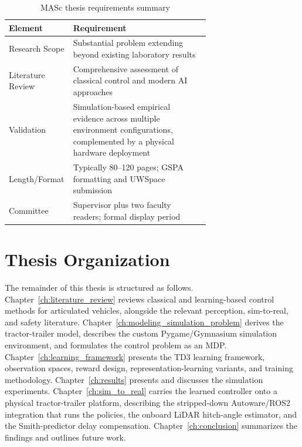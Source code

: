 \begin{table}[H]
\centering
\caption{MASc thesis requirements summary}
\label{tab:masc_requirements}
\begin{tabular}{l p{0.68\linewidth}}
\toprule
Element & Requirement \\
\midrule
Research Scope   & Substantial problem extending beyond existing laboratory results \\
Literature Review & Comprehensive assessment of classical control and modern AI approaches \\
Validation       & Simulation-based empirical evidence across multiple environment configurations, complemented by a physical hardware deployment \\
Length/Format    & Typically 80--120 pages; GSPA formatting and UWSpace submission \\
Committee        & Supervisor plus two faculty readers; formal display period \\
\bottomrule
\end{tabular}
\end{table}

\section{Thesis Organization}

The remainder of this thesis is structured as follows. Chapter~\ref{ch:literature_review} reviews classical and learning-based control methods for articulated vehicles, alongside the relevant perception, sim-to-real, and safety literature. Chapter~\ref{ch:modeling_simulation_problem} derives the tractor-trailer model, describes the custom Pygame/Gymnasium simulation environment, and formulates the control problem as an MDP. Chapter~\ref{ch:learning_framework} presents the TD3 learning framework, observation spaces, reward design, representation-learning variants, and training methodology. Chapter~\ref{ch:results} presents and discusses the simulation experiments. Chapter~\ref{ch:sim_to_real} carries the learned controller onto a physical tractor-trailer platform, describing the stripped-down Autoware/ROS2 integration that runs the policies, the onboard LiDAR hitch-angle estimator, and the Smith-predictor delay compensation. Chapter~\ref{ch:conclusion} summarizes the findings and outlines future work.
